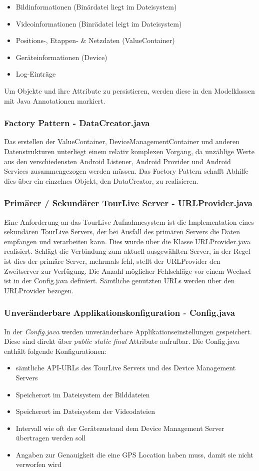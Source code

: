 \begin{itemize} [noitemsep,topsep=0pt]
	\item Bildinformationen (Binärdatei liegt im Dateisystem)
	\item Videoinformationen (Binrädatei leigt im Dateisystem)
	\item Positions-, Etappen- \& Netzdaten (ValueContainer)
	\item Geräteinformationen (Device)
	\item Log-Einträge
\end{itemize}

Um Objekte und ihre Attribute zu persistieren, werden diese in den Modelklassen mit Java Annotationen markiert. 

\subsubsection{Factory Pattern - DataCreator.java}
Das erstellen der ValueContainer, DeviceManagementContainer und anderen Datenstrukturen unterliegt einem relativ komplexen Vorgang, da unzählige Werte aus den verschiedensten Android Listener,  Android Provider und Android Services zusammengezogen werden müssen. Das Factory Pattern schafft Abhilfe dies über ein einzelnes Objekt, den DataCreator, zu realisieren.

\subsubsection{Primärer / Sekundärer TourLive Server - URLProvider.java}
Eine Anforderung an das TourLive Aufnahmesystem ist die Implementation eines sekundären TourLive Servers, der bei Ausfall des primären Servers die Daten empfangen und verarbeiten kann. Dies wurde über die Klasse URLProvider.java realisiert. Schlägt die Verbindung zum aktuell ausgewählten Server, in der Regel ist dies der primäre Server, mehrmals fehl, stellt der URLProvider den Zweitserver zur Verfügung. Die Anzahl möglicher Fehlschläge vor einem Wechsel ist in der Config.java definiert. Sämtliche genutzten URLs werden über den URLProvider bezogen.

\subsubsection{Unveränderbare Applikationskonfiguration - Config.java}
In der \textit{Config.java} werden unveränderbare Applikationseinstellungen gespeichert. Diese sind direkt über \textit{public static final} Attribute aufrufbar. Die Config.java enthält folgende Konfigurationen:
\begin{itemize} [noitemsep,topsep=0pt]
	\item sämtliche API-URLs des TourLive Servers und des Device Management Servers
	\item Speicherort im Dateisystem der Bilddateien
	\item Speicherort im Dateisystem der Videodateien
	\item Intervall wie oft der Gerätezustand dem Device Management Server übertragen werden soll
	\item Angaben zur Genauigkeit die eine GPS Location haben muss, damit sie nicht verworfen wird
\end{itemize}

